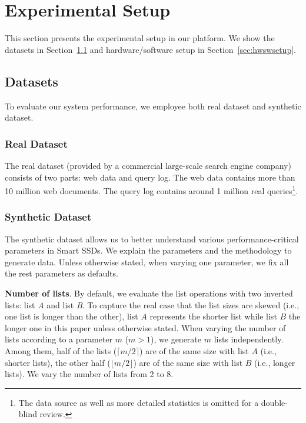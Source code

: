 
\section{Experimental Setup}\label{sec:expSetup}
This section presents the experimental setup in our platform. We show the datasets in Section~\ref{sec:datasets} and hardware/software setup in Section~\ref{sec:hwswsetup}.

\subsection{Datasets}\label{sec:datasets}
To evaluate our system performance, we employee both real dataset and synthetic dataset.
\subsubsection{Real Dataset}
The real dataset (provided by a commercial large-scale search engine company) consists of two parts: web data and query log. The web data contains more than 10 million web documents. The query log contains around 1 million real queries\footnote{\small The data source as well as more detailed statistics is omitted for a double-blind review.}.

\subsubsection{Synthetic Dataset}
The synthetic dataset allows us to better understand various performance-critical parameters in Smart SSDs.
We explain the parameters and the methodology to generate data.
Unless otherwise stated, when varying one parameter, we fix all the rest parameters as defaults.



\textbf{Number of lists}. By default, we evaluate the list operations with two inverted lists: list \emph{A} and list \emph{B}. To capture the real case that the list sizes are skewed (i.e., one list is longer than the other), list $A$ represents the shorter list while list $B$ the longer one in this paper unless otherwise stated.
When varying the number of lists according to a parameter $m$ ($m>1$), we generate $m$ lists independently. Among them, half of the lists ($\lceil m/2\rceil$) are of the same size with list $A$ (i.e., shorter lists), the other half ($\lfloor m/2\rfloor$) are of the same size with list $B$ (i.e., longer lists). We vary the number of lists from 2 to 8.

